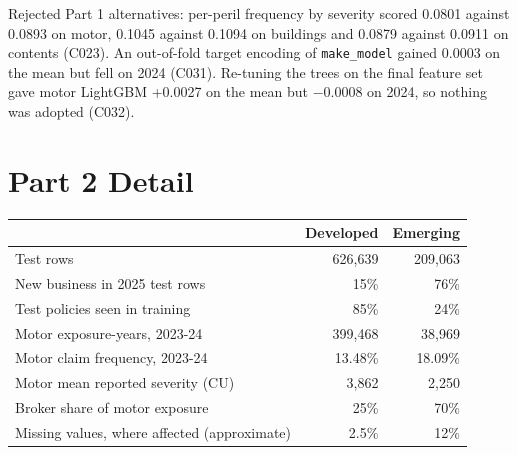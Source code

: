 Rejected Part 1 alternatives: per-peril frequency by severity scored 0.0801 against 0.0893 on motor, 0.1045 against
0.1094 on buildings and 0.0879 against 0.0911 on contents (C023). An out-of-fold target encoding of
\texttt{make\_model} gained 0.0003 on the mean but fell on 2024 (C031). Re-tuning the trees on the final feature set
gave motor LightGBM +0.0027 on the mean but $-0.0008$ on 2024, so nothing was adopted (C032).

\section{Part 2 Detail}
\label{ov:app-p2}

\begin{center}
\small
\begin{tabular}{lrr}
\hline
 & Developed & Emerging\\
\hline
Test rows & 626,639 & 209,063\\
New business in 2025 test rows & 15\% & 76\%\\
Test policies seen in training & 85\% & 24\%\\
Motor exposure-years, 2023-24 & 399,468 & 38,969\\
Motor claim frequency, 2023-24 & 13.48\% & 18.09\%\\
Motor mean reported severity (CU) & 3,862 & 2,250\\
Broker share of motor exposure & 25\% & 70\%\\
Missing values, where affected (approximate) & 2.5\% & 12\%\\
\hline
\end{tabular}
\end{center}

